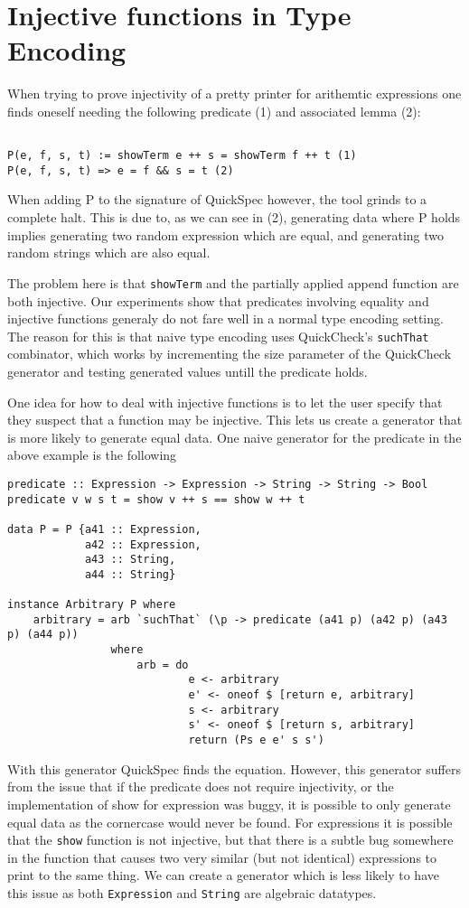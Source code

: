 \section{Injective functions in Type Encoding}
When trying to prove injectivity of a pretty printer for arithemtic expressions one
finds oneself needing the following predicate (1) and associated lemma (2):
\begin{verbatim}

P(e, f, s, t) := showTerm e ++ s = showTerm f ++ t (1)
P(e, f, s, t) => e = f && s = t (2)

\end{verbatim}
When adding P to the signature of QuickSpec however, the tool grinds to a complete halt. This is
due to, as we can see in (2), generating data where P holds implies generating two
random expression which are equal, and generating two random strings which are also equal.

The problem here is that \texttt{showTerm} and the partially applied append function are both injective.
Our experiments show that predicates involving equality and injective functions generaly do not
fare well in a normal type encoding setting. The reason for this is that naive type encoding uses
QuickCheck's \texttt{suchThat} combinator, which works by incrementing the size parameter of the QuickCheck
generator and testing generated values untill the predicate holds.

One idea for how to deal with injective functions is to let the user specify that they suspect that 
a function may be injective. This lets us create a generator that is more likely to generate
equal data. One naive generator for the predicate in the above example is the following
\begin{verbatim}
predicate :: Expression -> Expression -> String -> String -> Bool
predicate v w s t = show v ++ s == show w ++ t

data P = P {a41 :: Expression,
            a42 :: Expression,
            a43 :: String,
            a44 :: String}

instance Arbitrary P where
    arbitrary = arb `suchThat` (\p -> predicate (a41 p) (a42 p) (a43 p) (a44 p))
                where
                    arb = do
                            e <- arbitrary
                            e' <- oneof $ [return e, arbitrary]
                            s <- arbitrary
                            s' <- oneof $ [return s, arbitrary]
                            return (Ps e e' s s')
\end{verbatim}
With this generator QuickSpec finds the equation.
However, this generator suffers from the issue that if the predicate does not require injectivity, or the implementation
of show for expression was buggy, it is possible to only generate equal data as the cornercase would never be found.
For expressions it is possible that the \texttt{show} function is not injective, but that there is a subtle bug
somewhere in the function that causes two very similar (but not identical) expressions to print to the same thing.
We can create a generator which is less likely to have this issue as both \texttt{Expression}
and \texttt{String} are algebraic datatypes.
